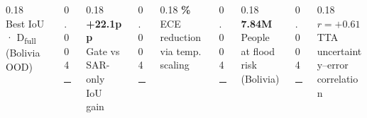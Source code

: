 \documentclass[final]{beamer}
\begin{document}
\begin{frame}[t,fragile]{}
\hspace*{1.6cm}
\begin{minipage}{0.95\textwidth}
\begin{tcolorbox}[
  enhanced, colback=dkuLightTeal, colframe=dkuTeal,
  boxrule=1.5pt, arc=8pt,
  left=10pt, right=10pt, top=8pt, bottom=8pt,
]
\begin{columns}[c]
  \begin{column}{0.18\textwidth}\centering
    {\color{dkuDarkTeal}\fontsize{38}{42}\bfseries{}}\\
    {\color{dkuGrey}\small Best IoU · D\textsubscript{full} (Bolivia OOD)}
  \end{column}
  \begin{column}{0.004\textwidth}\color{dkuTeal}\rule{1.5pt}{4.5cm}\end{column}
  \begin{column}{0.18\textwidth}\centering
    {\color{dkuDarkTeal}\fontsize{38}{42}\bfseries\selectfont +22.1pp}\\
    {\color{dkuGrey}\small Gate vs SAR-only IoU gain}
  \end{column}
  \begin{column}{0.004\textwidth}\color{dkuTeal}\rule{1.5pt}{4.5cm}\end{column}
  \begin{column}{0.18\textwidth}\centering
    {\color{dkuDarkTeal}\fontsize{38}{42}\bfseries{}\%}\\
    {\color{dkuGrey}\small ECE reduction via temp. scaling}
  \end{column}
  \begin{column}{0.004\textwidth}\color{dkuTeal}\rule{1.5pt}{4.5cm}\end{column}
  \begin{column}{0.18\textwidth}\centering
    {\color{dkuDarkTeal}\fontsize{38}{42}\bfseries\selectfont 7.84M}\\
    {\color{dkuGrey}\small People at flood risk (Bolivia)}
  \end{column}
  \begin{column}{0.004\textwidth}\color{dkuTeal}\rule{1.5pt}{4.5cm}\end{column}
  \begin{column}{0.18\textwidth}\centering
    {\color{dkuDarkTeal}\fontsize{38}{42}\bfseries\selectfont $r{=}{+}0.61$}\\
    {\color{dkuGrey}\small TTA uncertainty–error correlation}
  \end{column}
\end{columns}
\end{tcolorbox}
\end{minipage}


\end{frame}
\end{document}
